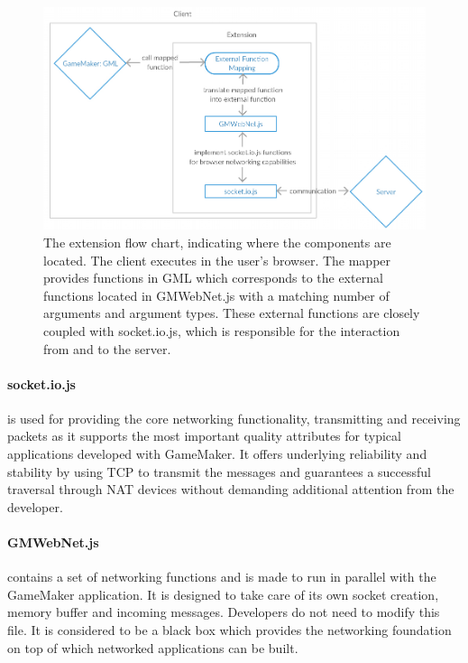 \documentclass[bsc, 12pt, twoside, singlespacing, parskip, abbrevs, notimes, normalheadings, logo, deptreport]{styles/infthesis}
\begin{document}
\begin{figure}[H]
\includegraphics[scale=0.42]{images/extension_flow.jpg}
\caption{The extension flow chart, indicating where the components are located. The client executes in the user's browser. The mapper provides functions in GML which corresponds to the external functions located in GMWebNet.js with a matching number of arguments and argument types. These external functions are closely coupled with socket.io.js, which is responsible for the interaction from and to the server.}
\label{fig:extension_flow}
\vspace{1em}
\end{figure}


\paragraph*{socket.io.js}
is used for providing the core networking functionality, transmitting and receiving packets as it supports the most important quality attributes for typical applications developed with GameMaker. It offers underlying reliability and stability by using TCP to transmit the messages and guarantees a successful traversal through NAT devices without demanding additional attention from the developer.

\paragraph*{GMWebNet.js}
contains a set of networking functions and is made to run in parallel with the GameMaker application. 
It is designed to take care of its own socket creation, memory buffer and incoming messages. Developers do not need to modify this file. It is considered to be a black box which provides the networking foundation on top of which networked applications can be built.
\end{document}
